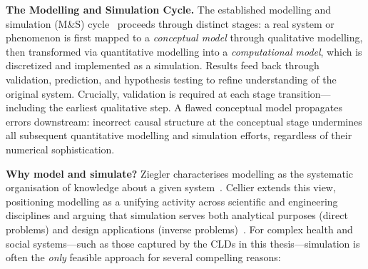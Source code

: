 \medskip
\noindent
\textbf{The Modelling and Simulation Cycle.} The established modelling and simulation (M\&S) cycle~\citep{ziegler1976theory, cellier1990continuous} proceeds through distinct stages: a real system or phenomenon is first mapped to a \emph{conceptual model} through qualitative modelling, then transformed via quantitative modelling into a \emph{computational model}, which is discretized and implemented as a simulation. Results feed back through validation, prediction, and hypothesis testing to refine understanding of the original system. Crucially, validation is required at each stage transition—including the earliest qualitative step. A flawed conceptual model propagates errors downstream: incorrect causal structure at the conceptual stage undermines all subsequent quantitative modelling and simulation efforts, regardless of their numerical sophistication.

\medskip
\noindent
\textbf{Why model and simulate?} Ziegler characterises modelling as the systematic organisation of knowledge about a given system~\citep{ziegler1976theory}. Cellier extends this view, positioning modelling as a unifying activity across scientific and engineering disciplines and arguing that simulation serves both analytical purposes (direct problems) and design applications (inverse problems)~\citep{cellier1990continuous}. For complex health and social systems---such as those captured by the CLDs in this thesis---simulation is often the \emph{only} feasible approach for several compelling reasons:

